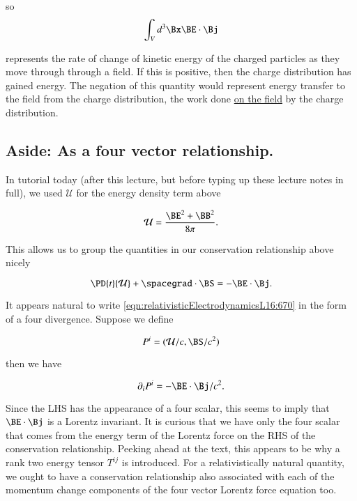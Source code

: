 so
\begin{equation}\label{eqn:relativisticElectrodynamicsL16:860}
\int_V d^3 \Bx \BE \cdot \Bj
\end{equation}

represents the rate of change of kinetic energy of the charged particles as they move through through a field.  If this is positive, then the charge distribution has gained energy.  The negation of this quantity would represent energy transfer to the field from the charge distribution, the work done \underline{on the field} by the charge distribution.

\subsection{Aside: As a four vector relationship.}

In tutorial today (after this lecture, but before typing up these lecture notes in full), we used $\mathcal{U}$ for the energy density term above

\begin{equation}\label{eqn:relativisticElectrodynamicsL16:650b}
\mathcal{U} = \frac{ \BE^2 + \BB^2 }{8 \pi} .
\end{equation}

This allows us to group the quantities in our conservation relationship above nicely

\begin{equation}\label{eqn:relativisticElectrodynamicsL16:670}
\PD{t}{\mathcal{U}} + \spacegrad \cdot \BS = - \BE \cdot \Bj.
\end{equation}

It appears natural to write \ref{eqn:relativisticElectrodynamicsL16:670} in the form of a four divergence.  Suppose we define

\begin{equation}\label{eqn:relativisticElectrodynamicsL16:710}
P^i = (\mathcal{U}/c, \BS/c^2)
\end{equation}

then we have

\begin{equation}\label{eqn:relativisticElectrodynamicsL16:730}
\partial_i P^i = - \BE \cdot \Bj/c^2.
\end{equation}

Since the LHS has the appearance of a four scalar, this seems to imply that $\BE \cdot \Bj$ is a Lorentz invariant.  It is curious that we have only the four scalar that comes from the energy term of the Lorentz force on the RHS of the conservation relationship.  Peeking ahead at the text, this appears to be why a rank two energy tensor $T^{ij}$ is introduced.  For a relativistically natural quantity, we ought to have a conservation relationship also associated with each of the momentum change components of the four vector Lorentz force equation too.

\EndArticle
